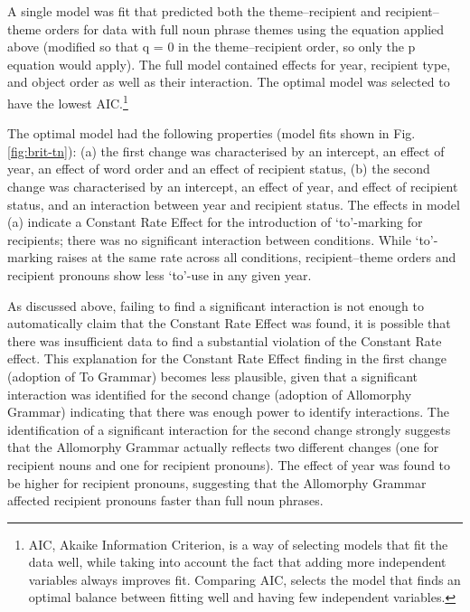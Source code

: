 	A single model was fit that predicted both the theme--recipient and recipient--theme orders for data with full noun phrase themes using the equation applied above (modified so that q = 0 in the theme--recipient order, so only the p equation would apply). The full model contained effects for year, recipient type, and object order as well as their interaction. The optimal model was selected to have the lowest AIC.\footnote{AIC, Akaike Information Criterion, is a way of selecting models that fit the data well, while taking into account the fact that adding more independent variables always improves fit. Comparing AIC, selects the model that finds an optimal balance between fitting well and having few independent variables.} 
	
	The optimal model had the following properties (model fits shown in Fig. \ref{fig:brit-tn}): (a) the first change was characterised by an intercept, an effect of year, an effect of word order and an effect of recipient status, (b) the second change was characterised by an intercept, an effect of year, and effect of recipient status, and an interaction between year and recipient status. The effects in model (a) indicate a Constant Rate Effect for the introduction of `to'-marking for recipients; there was no significant interaction between conditions. While `to'-marking raises at the same rate across all conditions, recipient--theme orders and recipient pronouns show less `to'-use in any given year. 
	
	As discussed above, failing to find a significant interaction is not enough to automatically claim that the Constant Rate Effect was found, it is possible that there was insufficient data to find a substantial violation of the Constant Rate effect. This explanation for the Constant Rate Effect finding in the first change (adoption of To Grammar) becomes less plausible, given that a significant interaction was identified for the second change (adoption of Allomorphy Grammar) indicating that there was enough power to identify interactions. The identification of a significant interaction for the second change strongly suggests that the Allomorphy Grammar actually reflects two different changes (one for recipient nouns and one for recipient pronouns). The effect of year was found to be higher for recipient pronouns, suggesting that the Allomorphy Grammar affected recipient pronouns faster than full noun phrases.
	
